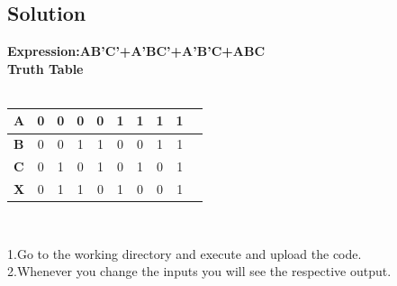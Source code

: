 \documentclass[10pt]{report}
\begin{document}
\begin{multicols}{2}
\section{Solution} 
\centering
\textbf{Expression:AB'C'+A'BC'+A'B'C+ABC}\\
\textbf{Truth Table}\\
\
\\\begin{tabular}{|l|c|c|c|c|c|c|c|c|c|}
\hline
\textbf{A} & 0 & 0 & 0 & 0 & 1 & 1 & 1 & 1\\
\hline
\textbf{B} & 0 & 0 & 1 & 1 & 0 & 0 & 1 & 1\\
\hline
\textbf{C} & 0 & 1 & 0 & 1 & 0 & 1 & 0 & 1\\
\hline
\textbf{X} & 0 & 1 & 1 & 0 & 1 & 0 & 0 & 1\\
\hline
\end{tabular}\\
\vspace{1cm}
\raggedright 1.Go to the working directory and execute and upload the code.\\
2.Whenever you change the inputs you will see the respective output. \\
\vspace{1cm}
\end{multicols}
\end{document}
